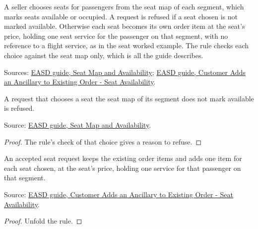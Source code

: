 \begin{definition}
  \label{def:ancillaries-choose-seats}
  A seller chooses seats for passengers from the seat map of each segment,
  which marks seats available or occupied.  A request is refused if a seat
  chosen is not marked available.  Otherwise each seat becomes its own order
  item at the seat's price, holding one seat service for the passenger on
  that segment, with no reference to a flight service, as in the seat worked
  example.  The rule checks each choice against the seat map only, which is
  all the guide describes.

  Sources: \href{https://standards.atlassian.net/wiki/spaces/EASD/pages/574586953}{EASD guide, Seat Map and Availability};
  \href{https://standards.atlassian.net/wiki/spaces/EASD/pages/842268814}{EASD guide, Customer Adds an Ancillary to Existing Order - Seat Availability}.
\end{definition}

\begin{theorem}
  \label{thm:ancillaries-seat-refuses-unavailable}
  A request that chooses a seat the seat map of its segment does not mark
  available is refused.

  Source: \href{https://standards.atlassian.net/wiki/spaces/EASD/pages/574586953}{EASD guide, Seat Map and Availability}.
\end{theorem}
\begin{proof}
  The rule's check of that choice gives a reason to refuse.
\end{proof}

\begin{theorem}
  \label{thm:ancillaries-seat-items}
  An accepted seat request keeps the existing order items and adds one item
  for each seat chosen, at the seat's price, holding one service for that
  passenger on that segment.

  Source: \href{https://standards.atlassian.net/wiki/spaces/EASD/pages/842268814}{EASD guide, Customer Adds an Ancillary to Existing Order - Seat Availability}.
\end{theorem}
\begin{proof}
  Unfold the rule.
\end{proof}

